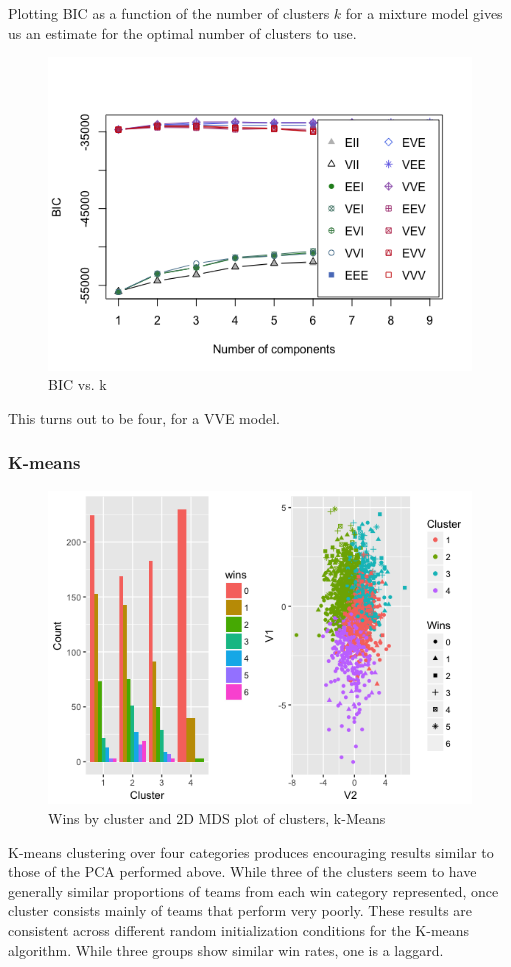 \documentclass[10pt,a4paper, hidelinks]{article} %
\begin{document}
Plotting BIC as a function of the number of clusters $k$ for a mixture model gives us an estimate for the optimal number of clusters to use.

\begin{figure}[H]
	\centering
	\includegraphics[width=0.7\linewidth]{../fig/sonofaBIC}
				\caption{BIC vs. k}
\end{figure}

This turns out to be four, for a VVE model.

\subsubsection{K-means}

\begin{figure}[H]
	\centering
	\includegraphics[width=0.7\linewidth]{../fig/clusterfun}
			\caption{Wins by cluster and 2D MDS plot of clusters, k-Means}
\end{figure}

K-means clustering over four categories produces encouraging results similar to those of the PCA performed above. While three of the clusters seem to have generally similar proportions of teams from each win category represented, once cluster consists mainly of teams that perform very poorly.  These results are consistent across different random initialization conditions for the K-means algorithm. While three groups show similar win rates, one is a laggard.
\end{document}
